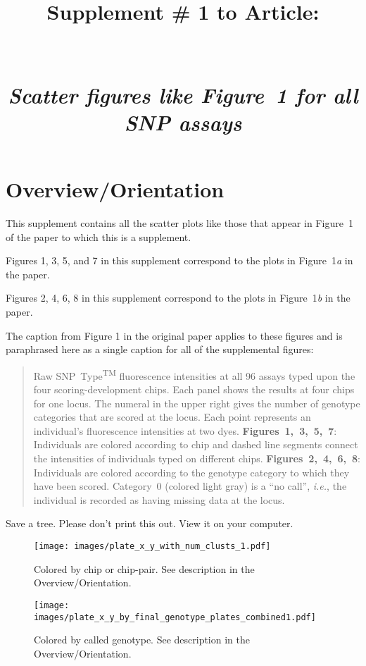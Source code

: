 \documentclass[11pt,landscape]{report}
\title{Supplement \# 1 to Article:\\
\myTitle\\
\mbox{}\\
{\em Scatter figures like Figure~1 for all SNP assays } }
\newcommand{\snptype}{SNP~Type\textsuperscript{{\tiny TM}}}
\newcommand{\ie}{{\em i.e.},\xspace }
\begin{document}
\maketitle
\section*{Overview/Orientation}
This supplement contains all the scatter plots like those that appear in Figure~1
of the paper to which this is a supplement.  

Figures 1, 3, 5, and 7 in this supplement correspond to the plots in Figure~1{\em a} in the paper.

Figures 2, 4, 6, 8 in this supplement correspond to the plots in Figure~1{\em b} in the paper.

The caption from Figure 1 in the original paper applies to these figures and is paraphrased here as a single
caption for all of the supplemental figures:
\begin{quotation}
Raw \snptype{} fluorescence intensities at all 96 assays typed upon the four
scoring-development chips. Each panel
shows the results at four chips for one locus.  The numeral in the upper right gives the number
of genotype categories that are scored at the locus.  Each point represents an individual's fluorescence
intensities at two dyes. {\bf Figures~1,~3,~5,~7}: Individuals are colored according to chip and dashed line
segments connect the intensities of individuals typed on different chips. {\bf Figures~2,~4,~6,~8}: Individuals are colored
according to the genotype category to which they have been scored.  Category~0 (colored light gray) is a ``no call'', \ie the individual
is recorded as having missing data at the locus. \end{quotation}

Save a tree. Please don't print this out.  View it on your computer.

\newpage

\begin{figure}
\texttt{[image: images/plate\_x\_y\_with\_num\_clusts\_1.pdf]}
\caption{Colored by chip or chip-pair. See description in the Overview/Orientation.}
\end{figure}

\begin{figure}
\texttt{[image: images/plate\_x\_y\_by\_final\_genotype\_plates\_combined1.pdf]}
\caption{Colored by called genotype. See description in the Overview/Orientation.}
\end{figure}
\end{document}
